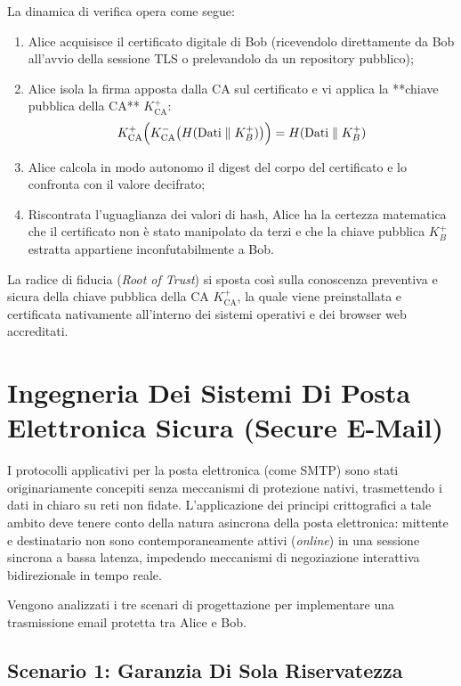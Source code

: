 \documentclass[11pt, a4paper]{article}
\begin{document}
La dinamica di verifica opera come segue:
\begin{enumerate}[leftmargin=*]
    \item Alice acquisisce il certificato digitale di Bob (ricevendolo direttamente da Bob all'avvio della sessione TLS o prelevandolo da un repository pubblico);
    \item Alice isola la firma apposta dalla CA sul certificato e vi applica la **chiave pubblica della CA** $K_{\text{CA}}^+$:
    \[
    K_{\text{CA}}^+\Bigl(K_{\text{CA}}^-\bigl(H(\text{Dati} \parallel K_B^+)\bigr)\Bigr) = H(\text{Dati} \parallel K_B^+)
    \]
    \item Alice calcola in modo autonomo il digest del corpo del certificato e lo confronta con il valore decifrato;
    \item Riscontrata l'uguaglianza dei valori di hash, Alice ha la certezza matematica che il certificato non è stato manipolato da terzi e che la chiave pubblica $K_B^+$ estratta appartiene inconfutabilmente a Bob.
\end{enumerate}

La radice di fiducia (\emph{Root of Trust}) si sposta così sulla conoscenza preventiva e sicura della chiave pubblica della CA $K_{\text{CA}}^+$, la quale viene preinstallata e certificata nativamente all'interno dei sistemi operativi e dei browser web accreditati.

\newpage

\section{Ingegneria Dei Sistemi Di Posta Elettronica Sicura (Secure E-Mail)}

I protocolli applicativi per la posta elettronica (come SMTP) sono stati originariamente concepiti senza meccanismi di protezione nativi, trasmettendo i dati in chiaro su reti non fidate. L'applicazione dei principi crittografici a tale ambito deve tenere conto della natura asincrona della posta elettronica: mittente e destinatario non sono contemporaneamente attivi (\emph{online}) in una sessione sincrona a bassa latenza, impedendo meccanismi di negoziazione interattiva bidirezionale in tempo reale.

Vengono analizzati i tre scenari di progettazione per implementare una trasmissione email protetta tra Alice e Bob.

\subsection{Scenario 1: Garanzia Di Sola Riservatezza}
\end{document}
